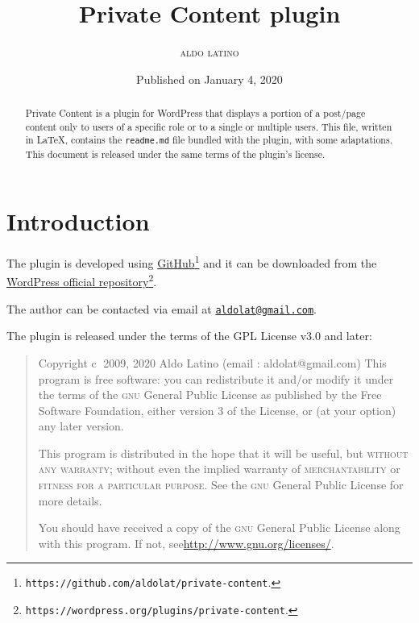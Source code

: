 \documentclass[a4paper,11pt]{article}
\begin{document}
\title{Private Content plugin}
\author{\textsc{aldo latino}}
\date{Published on January 4, 2020}

\maketitle

\begin{abstract}
\noindent Private Content is a plugin for WordPress that displays a portion of a post/page content only to users of a specific role or to a single or multiple users. This file, written in \LaTeX, contains the \texttt{readme.md} file bundled with the plugin, with some adaptations. This document is released under the same terms of the plugin's license.
\end{abstract}

\newpage

\tableofcontents

\newpage

\section{Introduction}

The plugin is developed using \href{https://github.com/aldolat/private-content}{GitHub}\footnote{\texttt{https://github.com/aldolat/private-content}.} and it can be downloaded from the \href{https://wordpress.org/plugins/private-content}{WordPress official repository}\footnote{\texttt{https://wordpress.org/plugins/private-content}.}.

The author can be contacted via email at \href{mailto:aldolat@gmail.com}{\texttt{aldolat@gmail.com}}.

The plugin is released under the terms of the GPL License v3.0 and later:

\begin{quote}
Copyright \textcircled{c} 2009, 2020  Aldo Latino  (email : aldolat@gmail.com)
This program is free software: you can redistribute it and/or modify
it under the terms of the \textsc{gnu} General Public License as published by
the Free Software Foundation, either version 3 of the License, or
(at your option) any later version.

This program is distributed in the hope that it will be useful,
but \textsc{without any warranty}; without even the implied warranty of
\textsc{merchantability} or \textsc{fitness for a particular purpose}.  See the
\textsc{gnu} General Public License for more details.

You should have received a copy of the \textsc{gnu} General Public License
along with this program. If not, see\newline\href{http://www.gnu.org/licenses/}{http://www.gnu.org/licenses/}.
\end{quote}
\end{document}
